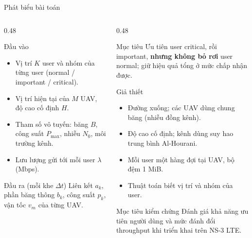 \documentclass[aspectratio=169,10pt,t]{beamer}
\begin{document}
\begin{frame}{Phát biểu bài toán}
\begin{columns}[T,onlytextwidth]
\begin{column}{0.48\textwidth}
\vspace{0pt}
  \begin{block}{Đầu vào}
    \small
    \begin{itemize}
      \item Vị trí $K$ user và nhóm của từng user (normal / important / critical).
      \item Vị trí hiện tại của $M$ UAV, độ cao cố định $H$.
      \item Tham số vô tuyến: băng $B$, công suất $P_{\max}$, nhiễu $N_0$, môi trường kênh.
      \item Lưu lượng gửi tới mỗi user $\lambda$ (Mbps).
    \end{itemize}
  \end{block}
  \begin{block}{Đầu ra (mỗi khe $\Delta t$)}
    \small
    Liên kết $a_k$, phần băng thông $b_k$, công suất $p_k$, vận tốc $v_m$ của từng UAV.
  \end{block}
\end{column}
\begin{column}{0.48\textwidth}
\vspace{0pt}
  \begin{block}{Mục tiêu}
    \small
    Ưu tiên user critical, rồi important, \textbf{nhưng không bỏ rơi} user normal; giữ hiệu quả tổng ở mức chấp nhận được.
  \end{block}
  \begin{block}{Giả thiết}
    \small
    \begin{itemize}
      \item Đường xuống; các UAV dùng chung băng (nhiễu đồng kênh).
      \item Độ cao cố định; kênh dùng suy hao trung bình Al-Hourani.
      \item Mỗi user một hàng đợi tại UAV, bộ đệm 1 MiB.
      \item Thuật toán biết vị trí và nhóm của user.
    \end{itemize}
  \end{block}
  \begin{block}{Mục tiêu kiểm chứng}
    \small
    Đánh giá khả năng ưu tiên người dùng và mức đánh đổi throughput khi triển khai trên NS-3 LTE.
  \end{block}
\end{column}
\end{columns}
\end{frame}
\end{document}

